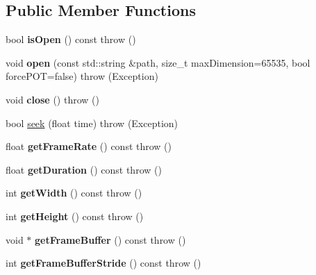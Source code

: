 \subsection*{Public Member Functions}
\begin{DoxyCompactItemize}
\item 
bool {\bfseries is\+Open} () const   throw ()\hypertarget{classVidFile_a8988372f6b08b96af32460f28e60244f}{}\label{classVidFile_a8988372f6b08b96af32460f28e60244f}

\item 
void {\bfseries open} (const std\+::string \&path, size\+\_\+t max\+Dimension=65535, bool force\+P\+OT=false)  throw (\+Exception)\hypertarget{classVidFile_a2afbdc27d888ac9aa7034f40f96570dd}{}\label{classVidFile_a2afbdc27d888ac9aa7034f40f96570dd}

\item 
void {\bfseries close} ()  throw ()\hypertarget{classVidFile_a4b792b54e3c42ed724890f6ef4af65e1}{}\label{classVidFile_a4b792b54e3c42ed724890f6ef4af65e1}

\item 
bool \hyperlink{classVidFile_aa77795e2c9b00d9d58f836edf02a5378}{seek} (float time)  throw (\+Exception)
\item 
float {\bfseries get\+Frame\+Rate} () const   throw ()\hypertarget{classVidFile_ab8060fbebe45a3af582323df324ce1fb}{}\label{classVidFile_ab8060fbebe45a3af582323df324ce1fb}

\item 
float {\bfseries get\+Duration} () const   throw ()\hypertarget{classVidFile_a71cd73d4d71bc653e4a3280dbc8185c0}{}\label{classVidFile_a71cd73d4d71bc653e4a3280dbc8185c0}

\item 
int {\bfseries get\+Width} () const   throw ()\hypertarget{classVidFile_ad16c9146110ed4ff1db4556819007aba}{}\label{classVidFile_ad16c9146110ed4ff1db4556819007aba}

\item 
int {\bfseries get\+Height} () const   throw ()\hypertarget{classVidFile_af2d8419b056382170ad7cfee067ec2da}{}\label{classVidFile_af2d8419b056382170ad7cfee067ec2da}

\item 
void $\ast$ {\bfseries get\+Frame\+Buffer} () const   throw ()\hypertarget{classVidFile_adc25049cb18f1aab542f3ba307c9c614}{}\label{classVidFile_adc25049cb18f1aab542f3ba307c9c614}

\item 
int {\bfseries get\+Frame\+Buffer\+Stride} () const   throw ()\hypertarget{classVidFile_adb7fdb7d921a5a96d42ad09498062522}{}\label{classVidFile_adb7fdb7d921a5a96d42ad09498062522}

\end{DoxyCompactItemize}


